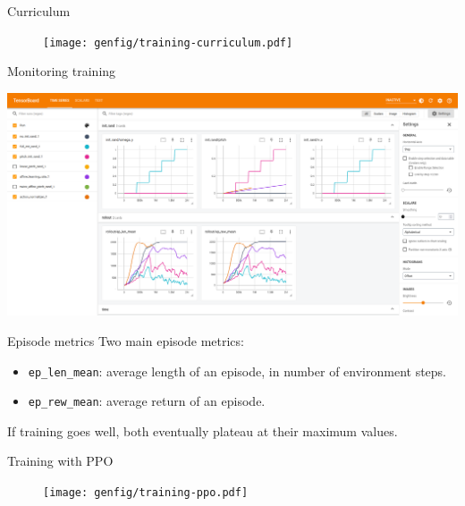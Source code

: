 \documentclass[10pt, aspectratio=1610]{beamer}
\begin{document}
\begin{frame}{Curriculum}
    \begin{figure}
        \texttt{[image: genfig/training-curriculum.pdf]}
    \end{figure}
\end{frame}

\begin{frame}{Monitoring training}
   \begin{adjustbox}{width=\paperwidth, height=\paperheight, keepaspectratio, center}
       \includegraphics{figures/tensorboard.png}
   \end{adjustbox}
\end{frame}

\begin{frame}{Episode metrics}
    Two main episode metrics:
    \begin{itemize}
        \item \texttt{ep_len_mean}: average length of an episode, in number of environment steps.
        \item \texttt{ep_rew_mean}: average return of an episode.
    \end{itemize}
    If training goes well, both eventually plateau at their maximum values.
\end{frame}

\begin{frame}{Training with PPO}
    \begin{figure}
        \texttt{[image: genfig/training-ppo.pdf]}
    \end{figure}
\end{frame}
\end{document}
